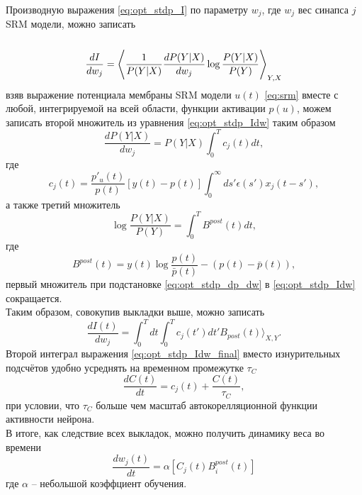 \documentclass[a4paper,10pt]{article}
\def\la{\left\langle\rule{0pt}{3em}}
\def\ra{\right\rangle}
\begin{document}
\indent Производную выражения \eqref{eq:opt_stdp_I} по параметру $w_{j}$, где $w_{j}$ вес синапса $j$ SRM модели, можно записать
\begin{equation}\label{eq:opt_stdp_Idw}
\frac{dI}{dw_j} = \la \frac{1}{P(Y|X)}\frac{dP(Y|X)}{dw_{j}}\log\frac{P(Y|X)}{P(Y)} \ra_{Y,X}
\end{equation} 
взяв выражение потенциала мембраны SRM модели $u(t)$ \eqref{eq:srm} вместе с любой, интегрируемой на всей области, функции активации $p(u)$, можем записать второй множитель из уравнения \eqref{eq:opt_stdp_Idw} таким образом
\begin{equation}\label{eq:opt_stdp_dp_dw}
\frac{dP(Y|X)}{dw_{j}} = P(Y|X)\int_{0}^{T} c_{j}(t)dt,
\end{equation} 
где
\begin{equation}
c_{j}(t) = \frac{p'_{u}(t)}{p(t)}[y(t)-p(t)]\int_{0}^{\infty}ds'\epsilon(s') x_{j}(t-s'),
\end{equation} 
а также третий множитель 
\begin{equation}
\log\frac{P(Y|X)}{P(Y)} = \int_{0}^{T}B^{post}(t)dt,
\end{equation}
где
\begin{equation}
B^{post}(t) = y(t)\log \frac{p(t)}{\bar{p}(t)} - (p(t)-\bar{p}(t)),
\end{equation} 
первый множитель при подстановке \eqref{eq:opt_stdp_dp_dw} в \eqref{eq:opt_stdp_Idw} сокращается.\\
\indent Таким образом, совокупив выкладки выше, можно записать\\
\begin{equation}\label{eq:opt_stdp_Idw_final}
\frac{dI(t)}{dw_j} = \int_{0}^{T} dt \int_{0}^{T} c_{j}(t')dt' B_{post}(t) \rangle _{X,Y}.
\end{equation}
\indent Второй интеграл выражения \eqref{eq:opt_stdp_Idw_final} вместо изнурительных подсчётов удобно усреднять на временном промежутке $\tau_{C}$ 
\begin{equation}
\frac{dC(t)}{dt} = c_{j}(t) + \frac{C(t)}{\tau_{C}},
\end{equation}
при условии, что $\tau_{C}$ больше чем масштаб автокорелляционной функции активности нейрона.\\
\indent В итоге, как следствие всех выкладок, можно получить динамику веса во времени
\begin{equation}\label{eq:opt_stdp_dw_dt}
\frac{dw_{j}(t)}{dt} = \alpha[C_{j}(t)B^{post}_{i}(t)]
\end{equation}
где $\alpha$ -- небольшой коэффциент обучения.\\
\end{document}
